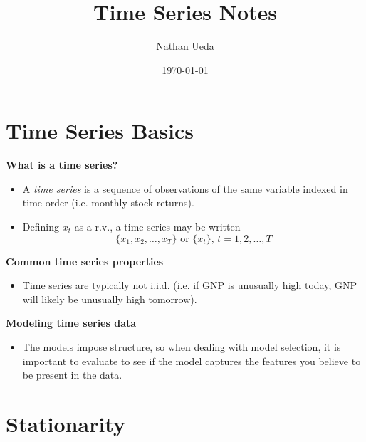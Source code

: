 \documentclass[11pt]{article}
\title{Time Series Notes}
\author{Nathan Ueda}
\date{\today}
\begin{document}
\maketitle 
\pagebreak
\tableofcontents 
\pagebreak

\section{Time Series Basics}

\textbf{What is a time series?}
\begin{itemize}
    \item A \textit{time series} is a sequence of observations of the same variable indexed in 
    time order (i.e. monthly stock returns). 
    \item Defining $x_t$ as a r.v., a time series may be written 
    \[ \{x_1, x_2, \ldots, x_T\} \text{ or }  \{x_t\}, \, t = 1, 2, \ldots, T \]
\end{itemize}


\textbf{Common time series properties}
\begin{itemize}
    \item Time series are typically not i.i.d. (i.e. if GNP is unusually high today, GNP will 
    likely be unusually high tomorrow).
\end{itemize}

\textbf{Modeling time series data}
\begin{itemize}
    \item The models impose structure, so when dealing with model selection, it is important 
    to evaluate to see if the model captures the features you believe to be present in the data.
\end{itemize}

\section{Stationarity}
\end{document}
